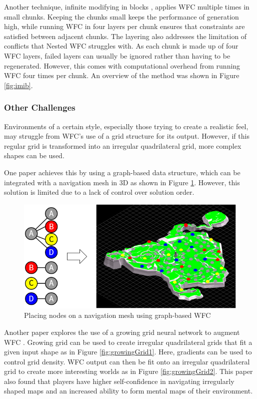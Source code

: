 Another technique, infinite modifying in blocks \cite{Infinite_Modifying_In_Blocks}, applies WFC multiple times in small chunks. Keeping the chunks small keeps the performance of generation high, while running WFC in four layers per chunk ensures that constraints are satisfied between adjacent chunks. The layering also addresses the limitation of conflicts that Nested WFC struggles with. As each chunk is made up of four WFC layers, failed layers can usually be ignored rather than having to be regenerated. However, this comes with computational overhead from running WFC four times per chunk. An overview of the method was shown in Figure \ref{fig:imib}.

\subsubsection{Other Challenges}
Environments of a certain style, especially those trying to create a realistic feel, may struggle from WFC's use of a grid structure for its output. However, if this regular grid is transformed into an irregular quadrilateral grid, more complex shapes can be used.

One paper \cite{WFC_Graph-based} achieves this by using a graph-based data structure, which can be integrated with a navigation mesh in 3D as shown in Figure \ref{fig:navigationMeshNodePlacement}. However, this solution is limited due to a lack of control over solution order.

\begin{figure}[H]
    \centering
    \includegraphics[width=\textwidth, height=0.3\textheight, keepaspectratio]{Images/NavigationMeshNodePlacement.png}
    \caption{Placing nodes on a navigation mesh using graph-based WFC \cite{WFC_Graph-based}}
    \label{fig:navigationMeshNodePlacement}
\end{figure}

Another paper explores the use of a growing grid neural network to augment WFC \cite{WFC_Neural_Network}. Growing grid can be used to create irregular quadrilateral grids that fit a given input shape as in Figure \ref{fig:growingGrid1}. Here, gradients can be used to control grid density. WFC output can then be fit onto an irregular quadrilateral grid to create more interesting worlds as in Figure \ref{fig:growingGrid2}. This paper also found that players have higher self-confidence in navigating irregularly shaped maps and an increased ability to form mental maps of their environment.

